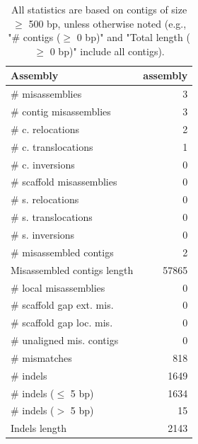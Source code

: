 \documentclass[12pt,a4paper]{article}
\begin{document}
\begin{table}[ht]
\begin{center}
\caption{All statistics are based on contigs of size $\geq$ 500 bp, unless otherwise noted (e.g., "\# contigs ($\geq$ 0 bp)" and "Total length ($\geq$ 0 bp)" include all contigs).}
\begin{tabular}{|l*{1}{|r}|}
\hline
Assembly & assembly \\ \hline
\# misassemblies & 3 \\ \hline
\hspace{2mm}\# contig misassemblies & 3 \\ \hline
\hspace{5mm}\# c. relocations & 2 \\ \hline
\hspace{5mm}\# c. translocations & 1 \\ \hline
\hspace{5mm}\# c. inversions & 0 \\ \hline
\hspace{2mm}\# scaffold misassemblies & 0 \\ \hline
\hspace{5mm}\# s. relocations & 0 \\ \hline
\hspace{5mm}\# s. translocations & 0 \\ \hline
\hspace{5mm}\# s. inversions & 0 \\ \hline
\# misassembled contigs & 2 \\ \hline
Misassembled contigs length & 57865 \\ \hline
\# local misassemblies & 0 \\ \hline
\# scaffold gap ext. mis. & 0 \\ \hline
\# scaffold gap loc. mis. & 0 \\ \hline
\# unaligned mis. contigs & 0 \\ \hline
\# mismatches & 818 \\ \hline
\# indels & 1649 \\ \hline
\hspace{5mm}\# indels ($\leq$ 5 bp) & 1634 \\ \hline
\hspace{5mm}\# indels ($>$ 5 bp) & 15 \\ \hline
Indels length & 2143 \\ \hline
\end{tabular}
\end{center}
\end{table}
\end{document}
